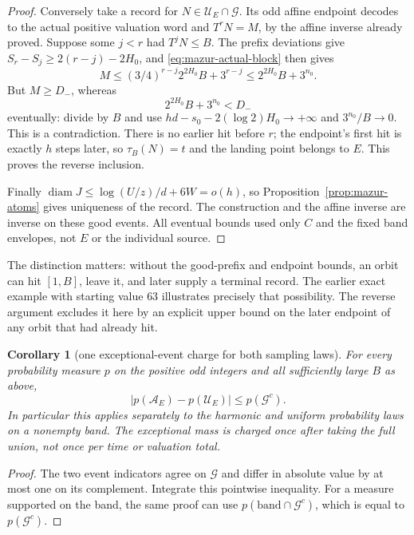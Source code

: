 \documentclass[11pt]{article}
\newtheorem{corollary}[proposition]{Corollary}
\theoremstyle{remark}\newtheorem{remark}[proposition]{Remark}
\begin{document}
\begin{proof}
Conversely take a record for $N\in\mathcal U_E\cap\mathcal G$.
Its odd affine endpoint decodes to the actual positive valuation word
and $T^rN=M$, by the affine inverse already proved.
Suppose some $j<r$ had $T^jN\le B$. The prefix deviations give
$S_r-S_j\ge2(r-j)-2H_0$, and \eqref{eq:mazur-actual-block} then gives
\[
 M\le(3/4)^{r-j}2^{2H_0}B+3^{r-j}
      \le2^{2H_0}B+3^{n_0}.
\]
But $M\ge D_-$, whereas
\[
 2^{2H_0}B+3^{n_0}<D_-
\]
eventually: divide by $B$ and use
$hd-s_0-2(\log2)H_0\to+\infty$ and
$3^{n_0}/B\to0$.
This is a contradiction. There is no earlier hit before $r$;
the endpoint's first hit is exactly $h$ steps later, so $\tau_B(N)=t$
and the landing point belongs to $E$. This proves the reverse inclusion.

Finally $\operatorname{diam}J\le\log(U/z)/d+6W=o(h)$,
so Proposition~\ref{prop:mazur-atoms} gives uniqueness of the record.
The construction and the affine inverse are inverse on these good events.
All eventual bounds used only $C$ and the fixed band envelopes,
not $E$ or the individual source.
\end{proof}

The distinction matters: without the good-prefix and endpoint bounds,
an orbit can hit $[1,B]$, leave it, and later supply a terminal record.
The earlier exact example with starting value $63$ illustrates precisely
that possibility. The reverse argument excludes it here by an explicit
upper bound on the later endpoint of any orbit that had already hit.

\begin{corollary}[one exceptional-event charge for both sampling laws]
\label{cor:mazur-coverage-mass}
For every probability measure $p$ on the positive odd integers and
all sufficiently large $B$ as above,
\begin{equation}
 |p(\mathcal A_E)-p(\mathcal U_E)|\le p(\mathcal G^c).
 \label{eq:mazur-coverage-mass}
\end{equation}
In particular this applies separately to the harmonic and uniform
probability laws on a nonempty band. The exceptional mass is charged
once after taking the full union, not once per time or valuation total.
\end{corollary}
\begin{proof}
The two event indicators agree on $\mathcal G$ and differ in absolute
value by at most one on its complement. Integrate this pointwise
inequality. For a measure supported on the band, the same proof can use
$p(\text{band}\cap\mathcal G^c)$, which is equal to $p(\mathcal G^c)$.
\end{proof}
\end{document}

